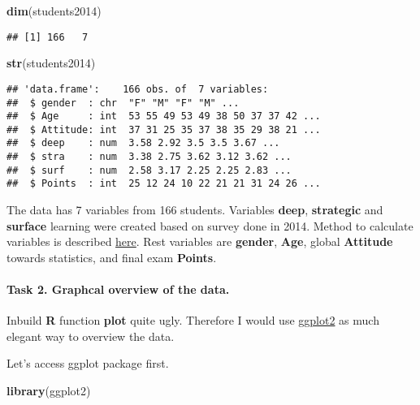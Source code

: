 \documentclass[
]{article}
\newenvironment{Shaded}{\begin{snugshade}}{\end{snugshade}}
\newcommand{\KeywordTok}[1]{\textcolor[rgb]{0.13,0.29,0.53}{\textbf{#1}}}
\newcommand{\NormalTok}[1]{#1}
\begin{document}
\begin{Shaded}
\begin{Highlighting}[]
\KeywordTok{dim}\NormalTok{(students2014)}
\end{Highlighting}
\end{Shaded}

\begin{verbatim}
## [1] 166   7
\end{verbatim}

\begin{Shaded}
\begin{Highlighting}[]
\KeywordTok{str}\NormalTok{(students2014)}
\end{Highlighting}
\end{Shaded}

\begin{verbatim}
## 'data.frame':    166 obs. of  7 variables:
##  $ gender  : chr  "F" "M" "F" "M" ...
##  $ Age     : int  53 55 49 53 49 38 50 37 37 42 ...
##  $ Attitude: int  37 31 25 35 37 38 35 29 38 21 ...
##  $ deep    : num  3.58 2.92 3.5 3.5 3.67 ...
##  $ stra    : num  3.38 2.75 3.62 3.12 3.62 ...
##  $ surf    : num  2.58 3.17 2.25 2.25 2.83 ...
##  $ Points  : int  25 12 24 10 22 21 21 31 24 26 ...
\end{verbatim}

The data has 7 variables from 166 students. Variables \textbf{deep},
\textbf{strategic} and \textbf{surface} learning were created based on
survey done in 2014. Method to calculate variables is described
\href{https://www.mv.helsinki.fi/home/kvehkala/JYTmooc/JYTOPKYS2-meta.txt}{here}.
Rest variables are \textbf{gender}, \textbf{Age}, global
\textbf{Attitude} towards statistics, and final exam \textbf{Points}.

\hypertarget{task-2.-graphcal-overview-of-the-data.}{%
\paragraph{Task 2. Graphcal overview of the
data.}\label{task-2.-graphcal-overview-of-the-data.}}

Inbuild \textbf{R} function \textbf{plot} quite ugly. Therefore I would
use \href{https://ggplot2.tidyverse.org/reference/ggplot.html}{ggplot2}
as much elegant way to overview the data.

Let's access ggplot package first.

\begin{Shaded}
\begin{Highlighting}[]
\KeywordTok{library}\NormalTok{(ggplot2)}
\end{Highlighting}
\end{Shaded}
\end{document}
